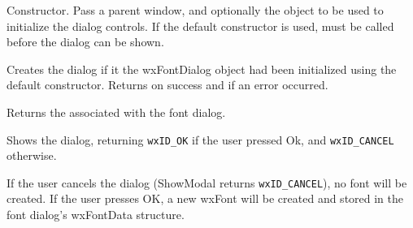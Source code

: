 
\label{wxfontdialogctor}




Constructor. Pass a parent window, and optionally the 
 object to be used to initialize the dialog
controls. If the default constructor is used, 
 must be called before the dialog can be
shown.

\label{wxfontdialogcreate}



Creates the dialog if it the wxFontDialog object had been initialized using the
default constructor. Returns \true on success and \false if an error
occurred.

\label{wxfontdialoggetfontdata}



Returns the  associated with the font dialog.

\label{wxfontdialogshowmodal}


Shows the dialog, returning {\tt wxID\_OK} if the user pressed Ok, and 
{\tt wxID\_CANCEL} otherwise.

If the user cancels the dialog (ShowModal returns {\tt wxID\_CANCEL}), no font
will be created. If the user presses OK, a new wxFont will be created and
stored in the font dialog's wxFontData structure.

